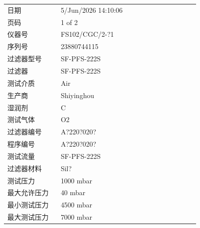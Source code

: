 \documentclass[UTF8,10pt,a4paper,fontset=fandol]{ctexart}
\newcommand{\fieldvalue}[1]{#1}
\begin{document}
\begin{tabular}{@{}p{0.25\linewidth}p{0.65\linewidth}@{}}
日期 &
\fieldvalue{5/Jun/2026 14:10:06} \\

页码 &
\fieldvalue{1 of 2} \\

仪器号 &
\fieldvalue{FS102/CGC/2-?1} \\

序列号 &
\fieldvalue{23880744115} \\

过滤器型号 &
\fieldvalue{SF-PFS-222S} \\

过滤器 &
\fieldvalue{SF-PFS-222S} \\

测试介质 &
\fieldvalue{Air} \\

生产商 &
\fieldvalue{Shiyinghou} \\

湿润剂 &
\fieldvalue{C} \\

测试气体 &
\fieldvalue{O2} \\

过滤器编号 &
\fieldvalue{A?220?020?} \\

程序编号 &
\fieldvalue{A?220?020?} \\

测试流量 &
\fieldvalue{SF-PFS-222S} \\

过滤器材料 &
\fieldvalue{Sil?} \\

测试压力 &
\fieldvalue{1000 mbar} \\

最大允许压力 &
\fieldvalue{40 mbar} \\

最小测试压力 &
\fieldvalue{4500 mbar} \\

最大测试压力 &
\fieldvalue{7000 mbar} \\
\end{tabular}
\end{document}
